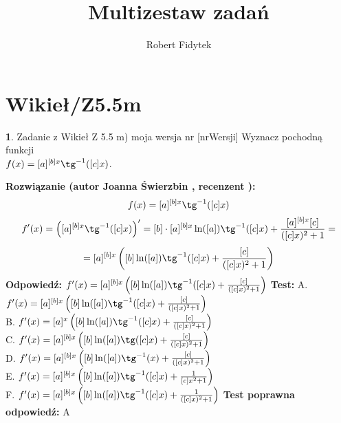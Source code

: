 \documentclass[12pt, a4paper]{article}
\title{Multizestaw zadań}
\author{Robert Fidytek}
\date{}
\theoremstyle{definition} %
\newtheorem{zad}{}
\newcommand{\kategoria}[1]{\section{#1}} %
\newcommand{\zadStart}[1]{\begin{zad}#1\newline} %
\newcommand{\zadStop}{\end{zad}}   %
\newcommand{\rozwStart}[2]{\noindent \textbf{Rozwiązanie (autor #1 , recenzent #2): }\newline} %
\newcommand{\rozwStop}{\newline}                                            %
\newcommand{\odpStart}{\noindent \textbf{Odpowiedź:}\newline}    %
\newcommand{\odpStop}{\newline}                                             %
\newcommand{\testStart}{\noindent \textbf{Test:}\newline} %
\newcommand{\testStop}{\newline} %
\newcommand{\kluczStart}{\noindent \textbf{Test poprawna odpowiedź:}\newline} %
\newcommand{\kluczStop}{\newline} %
\begin{document}
\maketitle


\kategoria{Wikieł/Z5.5m}
\zadStart{Zadanie z Wikieł Z 5.5 m) moja wersja nr [nrWersji]}
Wyznacz pochodną funkcji \\ $f(x)=[a]^{[b]x}\tg^{-1}([c]x)$.
\zadStop
\rozwStart{Joanna Świerzbin}{}
$$f(x)=[a]^{[b]x}\tg^{-1}([c]x)$$
$$f'(x)= \left( [a]^{[b]x}\tg^{-1}([c]x) \right)' =[b]\cdot[a]^{[b]x}\ln([a])\tg^{-1}([c]x)+\frac{[a]^{[b]x}[c]}{([c]x)^2+1}=$$
$$=[a]^{[b]x}\left([b]\ln([a])\tg^{-1}([c]x)+\frac{[c]}{([c]x)^2+1}\right)$$
\rozwStop
\odpStart
$ f'(x) =[a]^{[b]x}\left([b]\ln([a])\tg^{-1}([c]x)+\frac{[c]}{([c]x)^2+1}\right) $
\odpStop
\testStart
A. $ f'(x) =[a]^{[b]x}\left([b]\ln([a])\tg^{-1}([c]x)+\frac{[c]}{([c]x)^2+1}\right) $\\
B. $ f'(x) =[a]^{x}\left([b]\ln([a])\tg^{-1}([c]x)+\frac{[c]}{([c]x)^2+1}\right) $\\
C. $ f'(x) =[a]^{[b]x}\left([b]\ln([a])\tg([c]x)+\frac{[c]}{([c]x)^2+1}\right) $\\
D. $ f'(x) =[a]^{[b]x}\left([b]\ln([a])\tg^{-1}(x)+\frac{[c]}{([c]x)^2+1}\right) $\\
E. $ f'(x) =[a]^{[b]x}\left([b]\ln([a])\tg^{-1}([c]x)+\frac{1}{[c]x^2+1}\right) $\\
F. $ f'(x) =[a]^{[b]x}\left([b]\ln([a])\tg^{-1}([c]x)+\frac{1}{([c]x)^2+1}\right) $
\testStop
\kluczStart
A
\kluczStop
\end{document}
